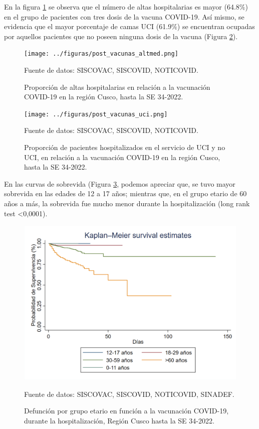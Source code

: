 \documentclass[12pt,a4paper,openany]{book}
\begin{document}
	En la figura \ref{fig:altas_postvacunación} se observa que el número de altas hospitalarias es mayor (64.8$\%$) en el grupo de pacientes con tres dosis de la vacuna COVID-19. Así mismo, se evidencia que el mayor porcentaje de camas UCI (61.9$\%$) se encuentran ocupadas por aquellos pacientes que no poseen ninguna dosis de la vacuna (Figura \ref{fig:uci_postvacunación}).

\begin{figure}[h]
	\caption{Proporción de altas hospitalarias en relación a la vacunación COVID-19 en la región Cusco, hasta la SE 34-2022.}\label{fig:altas_postvacunación}
	\begin{center}
		\texttt{[image: ../figuras/post\_vacunas\_altmed.png]}
	\end{center}
	{\footnotesize {Fuente de datos: SISCOVAC, SISCOVID, NOTICOVID.}}
\end{figure}

\begin{figure}[h]
	\caption{Proporción de pacientes hospitalizados en el servicio de UCI y no UCI, en relación a la vacunación COVID-19 en la región Cusco, hasta la SE 34-2022.}\label{fig:uci_postvacunación}
	\begin{center}
		\texttt{[image: ../figuras/post\_vacunas\_uci.png]}
	\end{center}
	{\footnotesize {Fuente de datos: SISCOVAC, SISCOVID, NOTICOVID.}}
\end{figure}
	
	\clearpage
	 En las curvas de sobrevida (Figura \ref{fig:supervivencia2}, podemos apreciar que, se tuvo mayor sobrevida en las edades de 12 a 17 años; mientras que, en el grupo etario de 60 años a más, la sobrevida fue mucho menor durante la hospitalización (long rank test <0,0001).
	
	\begin{figure}[h]
		\caption{Defunción por grupo etario en función a la vacunación COVID-19, durante la hospitalización, Región Cusco hasta la SE 34-2022.}\label{fig:supervivencia2}
		\begin{center}
			\includegraphics[width=0.95\linewidth]{../figuras/supervivencia_2.png}
		\end{center}
		{\footnotesize {Fuente de datos: SISCOVAC, SISCOVID, NOTICOVID, SINADEF.}}
	\end{figure}
	
\end{document}
